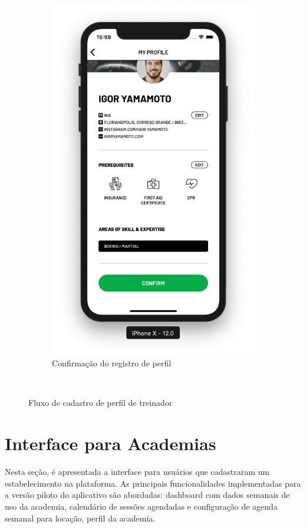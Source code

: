 \begin{figure}[H]
\begin{subfigure}[b]{0.3\textwidth}
        \includegraphics[width=\textwidth]{pfc/figuras/tr-register-profile-3.png}
        \caption{Confirmação do registro de perfil}
        \label{fig:register-tr-profile-confirmation}
    \end{subfigure}
    ~
    \caption{Fluxo de cadastro de perfil de treinador}
    \label{fig:register-tr-profile}
\end{figure}

\section{Interface para Academias}
Nesta seção, é apresentada a interface para usuários que cadastraram um estabelecimento na plataforma. As principais funcionalidades implementadas para a versão piloto do aplicativo são abordadas: dashboard com dados semanais de uso da academia, calendário de sessões agendadas e configuração de agenda semanal para locação, perfil da academia.


